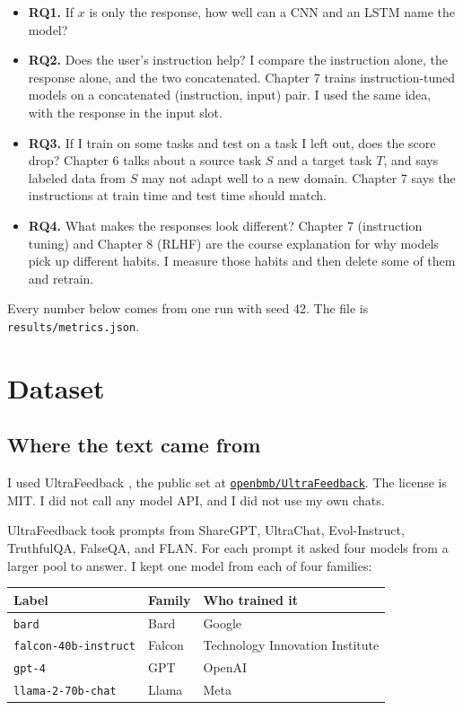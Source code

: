 \documentclass[11pt]{article}
\begin{document}
\begin{itemize}
\item \textbf{RQ1.} If $x$ is only the response, how well can a CNN and an LSTM name the model?
\item \textbf{RQ2.} Does the user's instruction help? I compare the instruction alone, the response alone, and the two concatenated. Chapter 7 trains instruction-tuned models on a concatenated (instruction, input) pair. I used the same idea, with the response in the input slot.
\item \textbf{RQ3.} If I train on some tasks and test on a task I left out, does the score drop? Chapter 6 talks about a source task $S$ and a target task $T$, and says labeled data from $S$ may not adapt well to a new domain. Chapter 7 says the instructions at train time and test time should match.
\item \textbf{RQ4.} What makes the responses look different? Chapter 7 (instruction tuning) and Chapter 8 (RLHF) are the course explanation for why models pick up different habits. I measure those habits and then delete some of them and retrain.
\end{itemize}

Every number below comes from one run with seed 42. The file is \texttt{results/metrics.json}.

\section{Dataset}
\label{sec:data}

\subsection{Where the text came from}

I used UltraFeedback \cite{cui2023ultrafeedback}, the public set at \href{https://huggingface.co/datasets/openbmb/UltraFeedback}{\texttt{openbmb/UltraFeedback}}. The license is MIT. I did not call any model API, and I did not use my own chats.

UltraFeedback took prompts from ShareGPT, UltraChat, Evol-Instruct, TruthfulQA, FalseQA, and FLAN. For each prompt it asked four models from a larger pool to answer. I kept one model from each of four families:

\begin{center}
\begin{tabular}{lll}
\toprule
Label & Family & Who trained it \\
\midrule
\texttt{bard} & Bard & Google \\
\texttt{falcon-40b-instruct} & Falcon & Technology Innovation Institute \\
\texttt{gpt-4} & GPT & OpenAI \\
\texttt{llama-2-70b-chat} & Llama & Meta \\
\bottomrule
\end{tabular}
\end{center}
\end{document}
